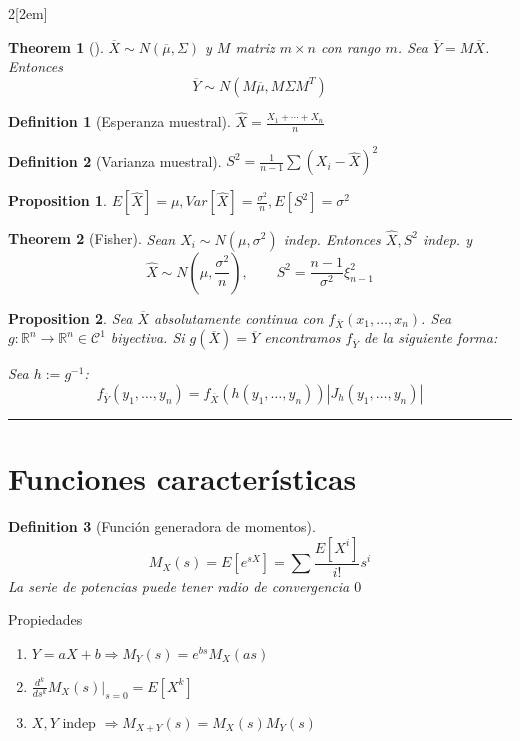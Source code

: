 \documentclass{myclass}
\newtheorem*{theorem}{Theorem}
\newtheorem*{proposition}{Proposition}
\newtheorem*{definition}{Definition}
\begin{document}
\begin{multicols}{2}[\columnsep2em]
\begin{theorem}[]
$\overline{X} \sim N(\overline{\mu}, \Sigma)$ y $M$ matriz $m\times n$ con rango $m$. Sea  $\overline{Y}=M \overline{X}$. Entonces
\[
\overline{Y}\sim  N(M \overline{\mu}, M \Sigma M^T)
\] 
\end{theorem}

\begin{definition}[Esperanza muestral] $\displaystyle \hat{X} = \frac{X_1+\cdots+X_n}{n}$
\end{definition}

\begin{definition}[Varianza muestral] $\displaystyle S^2 = \frac{1}{n-1}\sum (X_i- \hat{X})^2 $
\end{definition}

\begin{proposition}
$E[\hat{X}]=\mu, Var[\hat{X}]= \frac{\sigma ^2}{n}, E[S^2]=\sigma^2$ 
\end{proposition}

\begin{theorem}[Fisher]Sean $X_i\sim N(\mu, \sigma ^2)$ indep. Entonces $\hat{X}, S^2$ indep. y
 \[
 \hat{X} \sim N\left( \mu, \frac{\sigma^2}{n}\right), \qquad S^2 = \frac{n-1}{\sigma ^2}\xi^2_{n-1}
 \] 
\end{theorem}

 \begin{proposition}
Sea $\overline{X}$ absolutamente continua con $f_{\overline{X}}(x_1,\ldots,x_n)$. Sea $g:\mathbb{R}^n\to \mathbb{R}^n \in \mathcal{C}^1$ biyectiva. Si  $g(\overline{X})=\overline{Y}$ encontramos $f_{\overline{Y}}$ de la siguiente forma:

Sea $h:=g^{-1}$:
\[
f_{\overline{Y}}(y_1, \ldots, y_n) = f_{\overline{X}}(h(y_1,\ldots,y_n))|J_h(y_1,\ldots,y_n)|
\] 
\end{proposition}
\hrule
\section{Funciones características}
\begin{definition}[Función generadora de momentos]
\[
M_X(s) = E[e^{sX}] = \sum \frac{E[X^i]}{i!}s^i
\] 
La serie de potencias puede tener radio de convergencia $0$
\end{definition}

Propiedades
\begin{enumerate}[topsep=-6pt, itemsep=0pt]
  \item $Y = aX +b \Rightarrow M_Y(s) = e^{bs}M_X(as)$
  \item $\frac{d^k}{d s^k}M_X(s)|_{s=0} = E[X^k] $
  \item $X, Y$ indep  $\Rightarrow M_{X+Y}(s) = M_X(s)M_Y(s)$
\end{enumerate}


\end{multicols}
\end{document}
